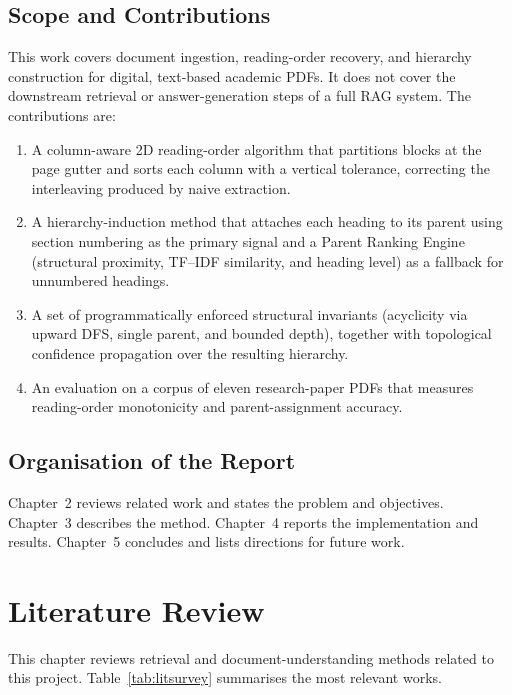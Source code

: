 \documentclass[12pt,a4paper,twoside,openright]{report}
\begin{document}
\section{Scope and Contributions}
This work covers document ingestion, reading-order recovery, and hierarchy construction
for digital, text-based academic PDFs. It does not cover the downstream retrieval or
answer-generation steps of a full RAG system. The contributions are:
\begin{enumerate}
  \item A column-aware 2D reading-order algorithm that partitions blocks at the page
  gutter and sorts each column with a vertical tolerance, correcting the interleaving
  produced by naive extraction.
  \item A hierarchy-induction method that attaches each heading to its parent using
  section numbering as the primary signal and a Parent Ranking Engine (structural
  proximity, TF--IDF similarity, and heading level) as a fallback for unnumbered
  headings.
  \item A set of programmatically enforced structural invariants (acyclicity via upward
  DFS, single parent, and bounded depth), together with topological confidence
  propagation over the resulting hierarchy.
  \item An evaluation on a corpus of eleven research-paper PDFs that measures
  reading-order monotonicity and parent-assignment accuracy.
\end{enumerate}

\section{Organisation of the Report}
Chapter~2 reviews related work and states the problem and objectives. Chapter~3
describes the method. Chapter~4 reports the implementation and results. Chapter~5
concludes and lists directions for future work.

\chapter{Literature Review}
This chapter reviews retrieval and document-understanding methods related to this
project. Table~\ref{tab:litsurvey} summarises the most relevant works.
\end{document}
